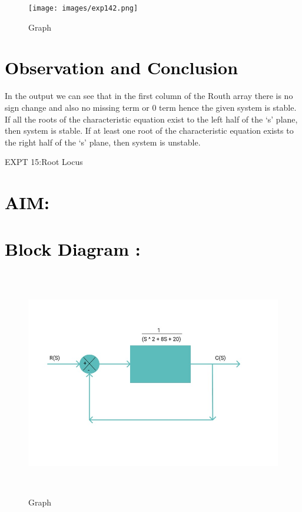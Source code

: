 \documentclass[12pt]{article}
\begin{document}
\begin{figure}[!hth]
        \centering
        \texttt{[image: images/exp142.png]}
        \caption{Graph}
        \label{Graph}
\end{figure}


\section*{\textcolor{black}{Observation and Conclusion}}
In the output we can see that in the first column of the Routh array there is no sign change and also no missing term or 0 term hence the given system is stable. If all the roots of the characteristic equation exist to the left half of the ‘s’ plane, then  system is stable. If at least one root of the characteristic equation exists to the right half of the ‘s’ plane, then  system is unstable.

 \pagebreak
 
 \begin{center}
    \LARGE {EXPT 15:Root Locus}
             
\end{center}

\section*{\textcolor{black}{AIM: }}

\section*{\textcolor{black}{Block Diagram :}}

\begin{figure}[!hth]
        \centering
        \includegraphics[width =20cm, height = 10cm]{images/root block.jpeg}
        \caption{Graph}
        \label{Graph}
\end{figure}
\end{document}
